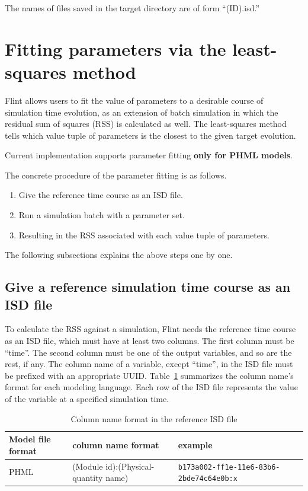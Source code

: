 \documentclass[a4paper,10pt]{report}
\begin{document}
The names of files saved in the target directory are of form ``(ID).isd.''

\section{Fitting parameters via the least-squares method}
\label{sec:org507753b}
Flint allows users to fit the value of parameters to a desirable course of
simulation time evolution, as an extension of batch simulation in which
the residual sum of squares (RSS) is calculated as well. The least-squares
method tells which value tuple of parameters is the closest to the given
target evolution.

Current implementation supports parameter fitting \textbf{only for PHML models}.

The concrete procedure of the parameter fitting is as follows.

\begin{enumerate}
\item Give the reference time course as an ISD file.
\item Run a simulation batch with a parameter set.
\item Resulting in the RSS associated with each value tuple of parameters.
\end{enumerate}

The following subsections explains the above steps one by one.

\subsection{Give a reference simulation time course  as an ISD file}
\label{sec:orgade890b}
To calculate the RSS against a simulation, Flint needs the reference time course
as an ISD file, which must have at least two columns.
The first column must be ``time''. The second column must be one of the output
variables, and so are the rest, if any.
The column name of a variable, except ``time'', in the ISD file must be prefixed
with an appropriate UUID.
Table~\ref{tab:orgb26e863} summarizes the column name's format for each
modeling language.
Each row of the ISD file represents the value of the variable at a specified
simulation time.

\begin{table}[htbp]
\caption{\label{tab:orgb26e863}Column name format in the reference ISD file}
\centering
\begin{tabular}{lll}
Model file format & column name format & example\\
\hline
PHML & (Module id):(Physical-quantity name) & \texttt{b173a002-ff1e-11e6-83b6-2bde74c64e0b:x}\\
\end{tabular}
\end{table}
\end{document}
